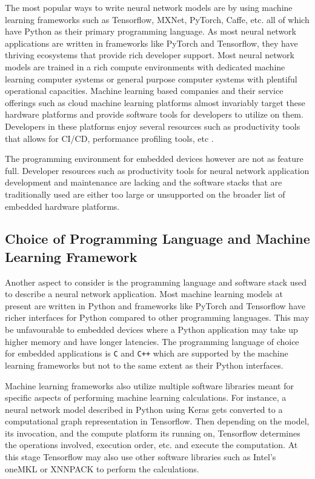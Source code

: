 The most popular ways to write neural network models are by using machine learning frameworks such as Tensorflow, MXNet, PyTorch, Caffe, etc. all of which have Python as their primary programming language. As most neural network applications are written in frameworks like PyTorch and Tensorflow, they have thriving ecosystems that provide rich developer support. Most neural network models are trained in a rich compute environments with dedicated machine learning computer systems or general purpose computer systems with plentiful operational capacities. Machine learning based companies and their service offerings such as cloud machine learning platforms almost invariably target these hardware platforms and provide software tools for developers to utilize on them. Developers in these platforms enjoy several resources such as productivity tools that allows for CI/CD, performance profiling tools, etc \cite{Saucedo_Awesome_Production_Machine}.

The programming environment for embedded devices however are not as feature full. Developer resources such as productivity tools for neural network application development and maintenance are lacking and the software stacks that are traditionally used are either too large or unsupported on the broader list of embedded hardware platforms.

\subsection{Choice of Programming Language and Machine Learning Framework}

Another aspect to consider is the programming language and software stack used to describe a neural network application. Most machine learning models at present are written in Python and frameworks like PyTorch and Tensorflow have richer interfaces for Python compared to other programming languages. This may be unfavourable to embedded devices where a Python application may take up higher memory and have longer latencies. The programming language of choice for embedded applications is \texttt{C} and \texttt{C++} which are supported by the machine learning frameworks but not to the same extent as their Python interfaces.

Machine learning frameworks also utilize multiple software libraries meant for specific aspects of performing machine learning calculations. For instance, a neural network model described in Python using Keras gets converted to a computational graph representation in Tensorflow. Then depending on the model, its invocation, and the compute platform its running on, Tensorflow determines the operations involved, execution order, etc. and execute the computation. At this stage Tensorflow may also use other software libraries such as Intel's oneMKL \cite{oneMKL} or XNNPACK \cite{XNNPACK} to perform the calculations.

